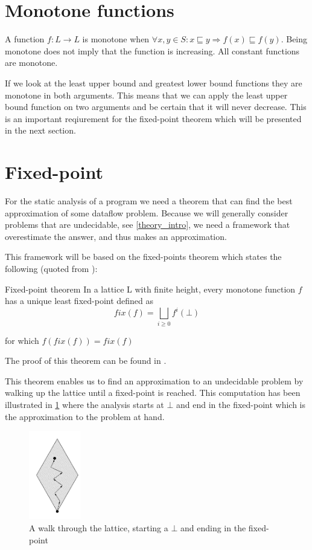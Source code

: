 \section{Monotone functions}
A function $f: L \to L$ is monotone when $\forall x,y \in S : x \sqsubseteq y \Rightarrow f(x) \sqsubseteq f(y)$.
Being monotone does not imply that the function is increasing.
All constant functions are monotone.

If we look at the least upper bound and greatest lower bound functions they are monotone in both arguments.
This means that we can apply the least upper bound function on two arguments and be certain that it will never decrease.
This is an important reqiurement for the fixed-point theorem which will be presented in the next section.

\section{Fixed-point}
For the static analysis of a program we need a theorem that can find the best approximation of some dataflow problem.
Because we will generally consider problems that are undecidable, see \cref{theory_intro}, we need a framework that overestimate the answer, and thus makes an approximation.

This framework will be based on the fixed-points theorem which states the following (quoted from \citet[p.~13]{schwartzbach}):

\begin{definition}{Fixed-point theorem}
In a lattice L with finite height, every monotone function $f$ has a unique least fixed-point defined as
\[ fix(f) = \bigsqcup_{i \ge 0} f^i(\bot) \]

for which $f(fix(f)) = fix(f)$
\end{definition}

\noindent
The proof of this theorem can be found in \citep[p.~13]{schwartzbach}.

This theorem enables us to find an approximation to an undecidable problem by walking up the lattice until a fixed-point is reached.
This computation has been illustrated in \cref{lattice_walk} where the analysis starts at $\bot$ and end in the fixed-point which is the approximation to the problem at hand.

\begin{figure}
\begin{center}
\includegraphics[width=0.2\textwidth]{figures/fixed-point_walk}
\end{center}
\caption{A walk through the lattice, starting a $\bot$ and ending in the fixed-point}
\label{lattice_walk}
\end{figure}

